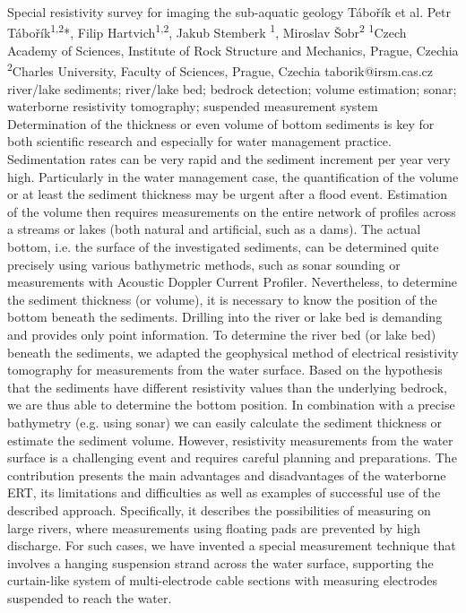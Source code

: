 \abstract
{Special resistivity survey for imaging the sub-aquatic geology} 
{Tábořík et al.} 
{Petr Tábořík\textsuperscript{1,2}*, Filip Hartvich\textsuperscript{1,2}, Jakub Stemberk	\textsuperscript{1}, Miroslav Šobr\textsuperscript{2}} 
{\TLtag} 
{
	\textsuperscript{1}Czech Academy of Sciences, Institute of Rock Structure and Mechanics, Prague, Czechia
	\textsuperscript{2}Charles University, Faculty of Sciences, Prague, Czechia
}
{taborik@irsm.cas.cz}  %
{river/lake sediments; river/lake bed; bedrock detection; volume estimation; sonar; waterborne resistivity tomography; suspended measurement system}
{
Determination of the thickness or even volume of bottom sediments is key for both scientific research and especially for water management practice. Sedimentation rates can be very rapid and the sediment increment per year very high. Particularly in the water management case, the quantification of the volume or at least the sediment thickness may be urgent after a flood event. Estimation of the volume then requires measurements on the entire network of profiles across a streams or lakes (both natural and artificial, such as a dams). The actual bottom, i.e. the surface of the investigated sediments, can be determined quite precisely using various bathymetric methods, such as sonar sounding or measurements with Acoustic Doppler Current Profiler. Nevertheless, to determine the sediment thickness (or volume), it is necessary to know the position of the bottom beneath the sediments. Drilling into the river or lake bed is demanding and provides only point information. To determine the river bed (or lake bed) beneath the sediments, we adapted the geophysical method of electrical resistivity tomography for measurements from the water surface. Based on the hypothesis that the sediments have different resistivity values than the underlying bedrock, we are thus able to determine the bottom position. In combination with a precise bathymetry (e.g. using sonar) we can easily calculate the sediment thickness or estimate the sediment volume. However, resistivity measurements from the water surface is a challenging event and requires careful planning and preparations. The contribution presents the main advantages and disadvantages of the waterborne ERT, its limitations and difficulties as well as examples of successful use of the described approach. Specifically, it describes the possibilities of measuring on large rivers, where measurements using floating pads are prevented by high discharge. For such cases, we have invented a special measurement technique that involves a hanging suspension strand across the water surface, supporting the curtain-like system of multi-electrode cable sections with measuring electrodes suspended to reach the water.
}
{
}

